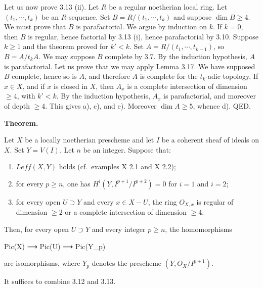 \documentclass[
]{article}
\newenvironment{Shaded}{}{}
\newcommand{\NormalTok}[1]{#1}
\providecommand{\tightlist}{%
  \setlength{\itemsep}{0pt}\setlength{\parskip}{0pt}}
\begin{document}
Let us now prove 3.13 (ii). Let \(R\) be a regular noetherian local
ring. Let \((t_{1}, \cdots, t_{k})\) be an \(R\)-sequence. Set
\(B = R/(t_{1}, \cdots, t_{k})\) and suppose \(\dim B \geqslant 4\). We
must prove that \(B\) is parafactorial. We argue by induction on \(k\).
If \(k = 0\), then \(B\) is regular, hence factorial by 3.13 (i), hence
parafactorial by 3.10. Suppose \(k \geqslant 1\) and the theorem proved
for \(k' < k\). Set \(A = R/(t_{1}, \cdots, t_{k-1})\), so
\(B = A/t_{k} A\). We may suppose \(B\) complete by 3.7. By the
induction hypothesis, \(A\) is parafactorial. Let us prove that we may
apply Lemma 3.17. We have supposed \(B\) complete, hence so is \(A\),
and therefore \(A\) is complete for the \(t_{k}\)-adic topology. If
\(x \in X\), and if \(x\) is closed in \(X\), then \(A_{x}\) is a
complete intersection of dimension \(\geqslant 4\), with \(k' < k\). By
the induction hypothesis, \(A_{x}\) is parafactorial, and moreover of
depth \(\geqslant 4\). This gives a), c), and e). Moreover
\(\dim A \geqslant 5\), whence d). QED.

\textbf{Theorem.}

Let \(X\) be a locally noetherian prescheme and let \(I\) be a coherent
sheaf of ideals on \(X\). Set \(Y = V(I)\). Let \(n\) be an integer.
Suppose that:

\begin{enumerate}
\def\labelenumi{\arabic{enumi}.}
\tightlist
\item
  \(Leff(X, Y)\) holds (cf.~examples X 2.1 and X 2.2);
\item
  for every \(p \geqslant n\), one has \(H^{i}(Y, I^{p+1}/I^{p+2}) = 0\)
  for \(i = 1\) and \(i = 2\);
\item
  for every open \(U \supset Y\) and every \(x \in X - U\), the ring
  \(O_{X,x}\) is regular of dimension \(\geqslant 2\) or a complete
  intersection of dimension \(\geqslant 4\).
\end{enumerate}

Then, for every open \(U \supset Y\) and every integer
\(p \geqslant n\), the homomorphisms

\begin{Shaded}
\begin{Highlighting}[]
\NormalTok{Pic(X) ⟶ Pic(U) ⟶ Pic(Y\_p)}
\end{Highlighting}
\end{Shaded}

are isomorphisms, where \(Y_{p}\) denotes the prescheme
\((Y, O_{X}/I^{p+1})\).

It suffices to combine 3.12 and 3.13.
\end{document}
